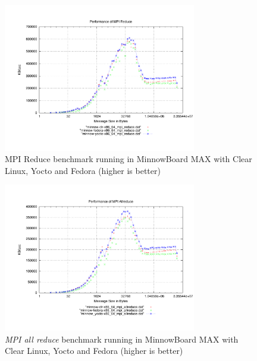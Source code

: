 \begin{figure}[H]
\centering
\includegraphics[width=0.75\textwidth]{images/mpbench_yocto_experiments/mpi_reduce.pdf}
\caption{MPI Reduce benchmark running in MinnowBoard MAX with Clear Linux, Yocto
and Fedora (higher is better)}
\label{mpi_reduce_yocto}
\end{figure}

\begin{figure}[H]
\centering
\includegraphics[width=0.75\textwidth]{images/mpbench_yocto_experiments/mpi_allreduce.pdf}
\caption{\textit{MPI all reduce} benchmark running in  MinnowBoard MAX with Clear Linux,
Yocto and Fedora (higher is better)}
\label{mpi_allreduce_yocto}
\end{figure}

